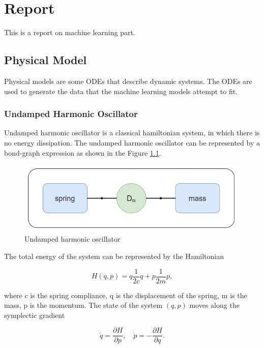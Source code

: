 \chapter{Report}
\label{cha:report}
This is a report on machine learning part.


\section{Physical Model}
Physical models are some ODEs that describe dynamic systems. The ODEs are used to generate the data that the machine learning models attempt to fit.
\subsection{Undamped Harmonic Oscillator}
Undamped harmonic oscillator is a classical hamiltonian system, in which there is no energy dissipation. The undamped harmonic oscillator can be represented by a bond-graph expression as shown in the Figure \ref{fig:undamped_harmonic_oscillator}.

\begin{figure}[h!]
    \centering
    \includegraphics[scale=0.5]{figures/1_Physical_Model/1_undamped_harmonic_oscillator.png}
    \caption{Undamped harmonic oscillator}
    \label{fig:undamped_harmonic_oscillator}
\end{figure}

The total energy of the system can be represented by the Hamiltonian

\begin{equation}
    \label{eq:Hamiltonian}
    H(q,p)=q\frac{1}{2c}q+p\frac{1}{2m}p,
\end{equation}

where c is the spring compliance, q is the displacement of the spring, m is the mass, p is the momentum. The state of the system $(q,p)$ moves along the symplectic gradient

\begin{equation}
    \label{eq:symplectic_gradient}
    \dot{q}=\frac{\partial H}{\partial p}, \quad \dot{p}=-\frac{\partial H}{\partial q}.
\end{equation}


